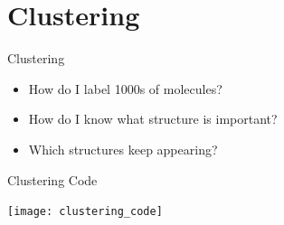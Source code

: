 \documentclass[aspectratio=169, 14pt]{beamer}
\begin{document}
\section{Clustering}
\begin{frame}{Clustering}

  \begin{itemize}
    \item How do I label 1000s of molecules?
    \item How do I know what structure is important?
    \item Which structures keep appearing?
  \end{itemize}

\end{frame}

\begin{frame}{Clustering Code}

  \begin{center}
    \texttt{[image: clustering\_code]}
  \end{center}

\end{frame}
\end{document}
